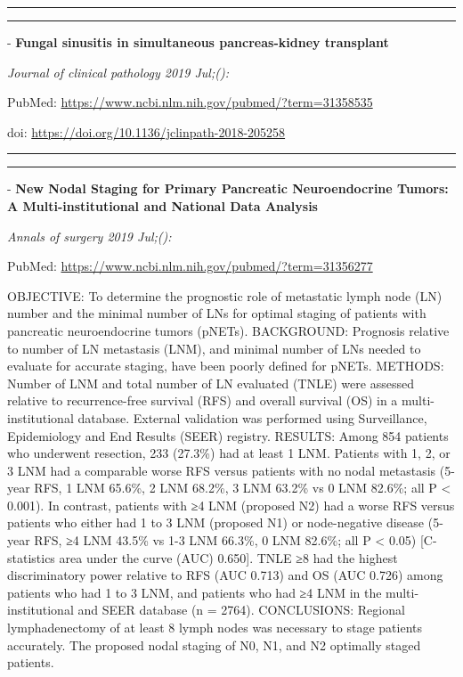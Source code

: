 \documentclass[]{article}
\begin{document}
{}

{}

\begin{center}\rule{0.5\linewidth}{\linethickness}\end{center}

\begin{center}\rule{0.5\linewidth}{\linethickness}\end{center}

 - \textbf{Fungal sinusitis in simultaneous pancreas-kidney transplant}

\emph{Journal of clinical pathology 2019 Jul;():}

PubMed: \url{https://www.ncbi.nlm.nih.gov/pubmed/?term=31358535}

doi: \url{https://doi.org/10.1136/jclinpath-2018-205258}

{}

{}

\begin{center}\rule{0.5\linewidth}{\linethickness}\end{center}

\begin{center}\rule{0.5\linewidth}{\linethickness}\end{center}

 - \textbf{New Nodal Staging for Primary Pancreatic Neuroendocrine
Tumors: A Multi-institutional and National Data Analysis}

\emph{Annals of surgery 2019 Jul;():}

PubMed: \url{https://www.ncbi.nlm.nih.gov/pubmed/?term=31356277}

OBJECTIVE: To determine the prognostic role of metastatic lymph node
(LN) number and the minimal number of LNs for optimal staging of
patients with pancreatic neuroendocrine tumors (pNETs). BACKGROUND:
Prognosis relative to number of LN metastasis (LNM), and minimal number
of LNs needed to evaluate for accurate staging, have been poorly defined
for pNETs. METHODS: Number of LNM and total number of LN evaluated
(TNLE) were assessed relative to recurrence-free survival (RFS) and
overall survival (OS) in a multi-institutional database. External
validation was performed using Surveillance, Epidemiology and End
Results (SEER) registry. RESULTS: Among 854 patients who underwent
resection, 233 (27.3\%) had at least 1 LNM. Patients with 1, 2, or 3 LNM
had a comparable worse RFS versus patients with no nodal metastasis
(5-year RFS, 1 LNM 65.6\%, 2 LNM 68.2\%, 3 LNM 63.2\% vs 0 LNM 82.6\%;
all P \textless{} 0.001). In contrast, patients with ≥4 LNM (proposed
N2) had a worse RFS versus patients who either had 1 to 3 LNM (proposed
N1) or node-negative disease (5-year RFS, ≥4 LNM 43.5\% vs 1-3 LNM
66.3\%, 0 LNM 82.6\%; all P \textless{} 0.05) {[}C-statistics area under
the curve (AUC) 0.650{]}. TNLE ≥8 had the highest discriminatory power
relative to RFS (AUC 0.713) and OS (AUC 0.726) among patients who had 1
to 3 LNM, and patients who had ≥4 LNM in the multi-institutional and
SEER database (n = 2764). CONCLUSIONS: Regional lymphadenectomy of at
least 8 lymph nodes was necessary to stage patients accurately. The
proposed nodal staging of N0, N1, and N2 optimally staged patients.
\end{document}
